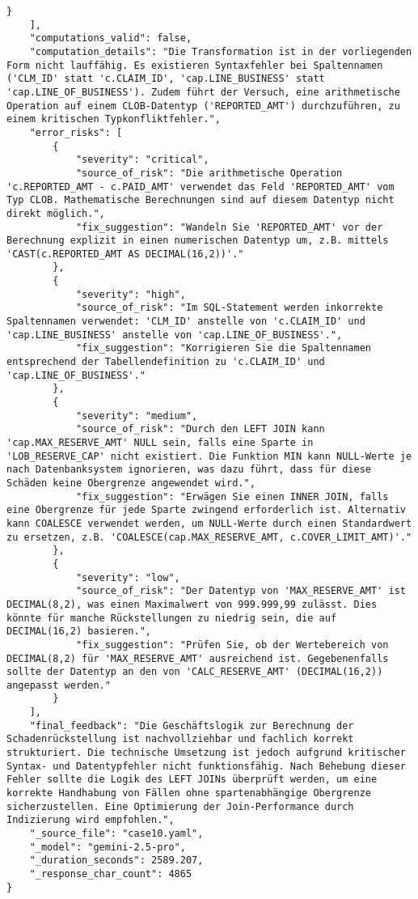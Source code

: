 \begin{lstlisting}[caption={Ausgabe: Gemini 2.5 Pro Anwendungsfall 10 Robustheitsdurchlauf},label={gemini_case10_prompt3}]
        }
    ],
    "computations_valid": false,
    "computation_details": "Die Transformation ist in der vorliegenden Form nicht lauffähig. Es existieren Syntaxfehler bei Spaltennamen ('CLM_ID' statt 'c.CLAIM_ID', 'cap.LINE_BUSINESS' statt 'cap.LINE_OF_BUSINESS'). Zudem führt der Versuch, eine arithmetische Operation auf einem CLOB-Datentyp ('REPORTED_AMT') durchzuführen, zu einem kritischen Typkonfliktfehler.",
    "error_risks": [
        {
            "severity": "critical",
            "source_of_risk": "Die arithmetische Operation 'c.REPORTED_AMT - c.PAID_AMT' verwendet das Feld 'REPORTED_AMT' vom Typ CLOB. Mathematische Berechnungen sind auf diesem Datentyp nicht direkt möglich.",
            "fix_suggestion": "Wandeln Sie 'REPORTED_AMT' vor der Berechnung explizit in einen numerischen Datentyp um, z.B. mittels 'CAST(c.REPORTED_AMT AS DECIMAL(16,2))'."
        },
        {
            "severity": "high",
            "source_of_risk": "Im SQL-Statement werden inkorrekte Spaltennamen verwendet: 'CLM_ID' anstelle von 'c.CLAIM_ID' und 'cap.LINE_BUSINESS' anstelle von 'cap.LINE_OF_BUSINESS'.",
            "fix_suggestion": "Korrigieren Sie die Spaltennamen entsprechend der Tabellendefinition zu 'c.CLAIM_ID' und 'cap.LINE_OF_BUSINESS'."
        },
        {
            "severity": "medium",
            "source_of_risk": "Durch den LEFT JOIN kann 'cap.MAX_RESERVE_AMT' NULL sein, falls eine Sparte in 'LOB_RESERVE_CAP' nicht existiert. Die Funktion MIN kann NULL-Werte je nach Datenbanksystem ignorieren, was dazu führt, dass für diese Schäden keine Obergrenze angewendet wird.",
            "fix_suggestion": "Erwägen Sie einen INNER JOIN, falls eine Obergrenze für jede Sparte zwingend erforderlich ist. Alternativ kann COALESCE verwendet werden, um NULL-Werte durch einen Standardwert zu ersetzen, z.B. 'COALESCE(cap.MAX_RESERVE_AMT, c.COVER_LIMIT_AMT)'."
        },
        {
            "severity": "low",
            "source_of_risk": "Der Datentyp von 'MAX_RESERVE_AMT' ist DECIMAL(8,2), was einen Maximalwert von 999.999,99 zulässt. Dies könnte für manche Rückstellungen zu niedrig sein, die auf DECIMAL(16,2) basieren.",
            "fix_suggestion": "Prüfen Sie, ob der Wertebereich von DECIMAL(8,2) für 'MAX_RESERVE_AMT' ausreichend ist. Gegebenenfalls sollte der Datentyp an den von 'CALC_RESERVE_AMT' (DECIMAL(16,2)) angepasst werden."
        }
    ],
    "final_feedback": "Die Geschäftslogik zur Berechnung der Schadenrückstellung ist nachvollziehbar und fachlich korrekt strukturiert. Die technische Umsetzung ist jedoch aufgrund kritischer Syntax- und Datentypfehler nicht funktionsfähig. Nach Behebung dieser Fehler sollte die Logik des LEFT JOINs überprüft werden, um eine korrekte Handhabung von Fällen ohne spartenabhängige Obergrenze sicherzustellen. Eine Optimierung der Join-Performance durch Indizierung wird empfohlen.",
    "_source_file": "case10.yaml",
    "_model": "gemini-2.5-pro",
    "_duration_seconds": 2589.207,
    "_response_char_count": 4865
}
\end{lstlisting}

